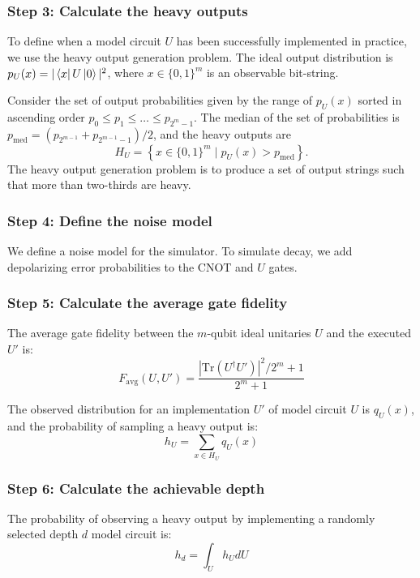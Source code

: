 \documentclass[11pt, oneside]{article}   	%
\begin{document}
\subsubsection{Step 3: Calculate the heavy outputs}
To define when a model circuit $U$ has been successfully implemented in practice, we use the heavy output generation problem. The ideal output distribution is 
$p_U(x) = | \bra{x} U \ket{0} |^2$, where $x \in \{0,1\}^m$ is an observable bit-string.

Consider the set of output probabilities given by the range of $p_U(x)$ sorted in ascending order 
$p_0 \leq p_1 \leq \dots \leq p_{2^m-1}$. 
The median of the set of probabilities is  $p_{\mathrm{med}} = (p_{2^{m-1}} + p_{2^{m-1}-1})/2$, and the heavy outputs are 
\begin{equation}
H_U = \left\{ x \in \{0,1\}^m \mid p_U(x) > p_{\mathrm{med}} \right\}.
\end{equation}
 The heavy output generation problem is to produce a set of output strings such that more than two-thirds are heavy.

\subsubsection{Step 4: Define the noise model}
We define a noise model for the simulator. To simulate decay, we add depolarizing error probabilities to the CNOT and $U$ gates.

\subsubsection{Step 5: Calculate the average gate fidelity}
The average gate fidelity between the $m$-qubit ideal unitaries $U$ and the executed $U'$ is: 
\begin{equation}
F_{\mathrm{avg}}(U,U') = \frac{|\mathrm{Tr}(U^{\dagger}U')|^2/2^m+1}{2^m+1}
\end{equation}

The observed distribution for an implementation $U'$ of model circuit $U$ is $q_U(x)$, and the probability of sampling a heavy output is: $$ h_U = \sum_{x \in H_U} q_U(x)$$

\subsubsection{Step 6: Calculate the achievable depth}
The probability of observing a heavy output by implementing a randomly selected depth $d$ model circuit is: 
\begin{equation}
h_d = \int_U h_U dU
\end{equation}
\end{document}
